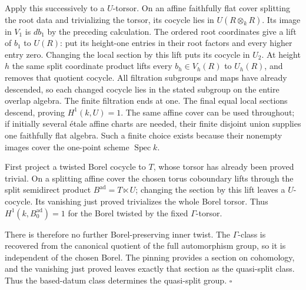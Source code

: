 \documentclass[11pt,a4paper,openany]{report}
\newcounter{none}
\begin{document}
Apply this successively to a \(U\)-torsor. On an affine faithfully flat cover splitting the root data and trivializing the torsor, its cocycle lies in \(U(R\otimes_k R)\). Its image in \(V_1\) is \(d b_1\) by the preceding calculation. The ordered root coordinates give a lift of \(b_1\) to \(U(R)\): put its height-one entries in their root factors and every higher entry zero. Changing the local section by this lift puts its cocycle in \(U_2\). At height \(h\) the same split coordinate product lifts every \(b_h\in V_h(R)\) to \(U_h(R)\), and removes that quotient cocycle. All filtration subgroups and maps have already descended, so each changed cocycle lies in the stated subgroup on the entire overlap algebra. The finite filtration ends at one. The final equal local sections descend, proving \(H^1(k,U)=1\). The same affine cover can be used throughout; if initially several étale affine charts are needed, their finite disjoint union supplies one faithfully flat algebra. Such a finite choice exists because their nonempty images cover the one-point scheme \(\operatorname{Spec}k\).

First project a twisted Borel cocycle to \(T\), whose torsor has already been proved trivial. On a splitting affine cover the chosen torus coboundary lifts through the split semidirect product \(B^{\mathrm{ad}}=T\ltimes U\); changing the section by this lift leaves a \(U\)-cocycle. Its vanishing just proved trivializes the whole Borel torsor. Thus \(H^1(k,B_0^{\mathrm{ad}})=1\) for the Borel twisted by the fixed \(\Gamma\)-torsor.

There is therefore no further Borel-preserving inner twist. The \(\Gamma\)-class is recovered from the canonical quotient of the full automorphism group, so it is independent of the chosen Borel. The pinning provides a section on cohomology, and the vanishing just proved leaves exactly that section as the quasi-split class. Thus the based-datum class determines the quasi-split group. \(\square\)
\end{document}
